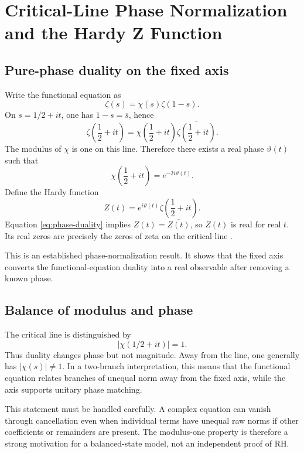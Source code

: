 \chapter{Critical-Line Phase Normalization and the Hardy Z Function}
\label{ch:hardy}

\section{Pure-phase duality on the fixed axis}
Write the functional equation as
\begin{equation}
\zeta(s)=\chi(s)\zeta(1-s).
\end{equation}
On $s=1/2+it$, one has $1-s=\overline{s}$, hence
\begin{equation}
\zeta\!\left(\frac12+it\right)
=\chi\!\left(\frac12+it\right)
\overline{\zeta\!\left(\frac12+it\right)}.
\label{eq:phase-duality}
\end{equation}
The modulus of $\chi$ is one on this line. Therefore there exists a real phase $\vartheta(t)$ such that
\begin{equation}
\chi\!\left(\frac12+it\right)=e^{-2i\vartheta(t)}.
\end{equation}
Define the Hardy function
\begin{equation}
Z(t)=e^{i\vartheta(t)}\zeta\!\left(\frac12+it\right).
\label{eq:hardyZ}
\end{equation}
Equation \eqref{eq:phase-duality} implies $Z(t)=\overline{Z(t)}$, so $Z(t)$ is real for real $t$. Its real zeros are precisely the zeros of zeta on the critical line \cite{Titchmarsh1986,DLMF25}.

This is an established phase-normalization result. It shows that the fixed axis converts the functional-equation duality into a real observable after removing a known phase.

\section{Balance of modulus and phase}
The critical line is distinguished by
\begin{equation}
|\chi(1/2+it)|=1.
\end{equation}
Thus duality changes phase but not magnitude. Away from the line, one generally has $|\chi(s)|\neq1$. In a two-branch interpretation, this means that the functional equation relates branches of unequal norm away from the fixed axis, while the axis supports unitary phase matching.

This statement must be handled carefully. A complex equation can vanish through cancellation even when individual terms have unequal raw norms if other coefficients or remainders are present. The modulus-one property is therefore a strong motivation for a balanced-state model, not an independent proof of RH.

